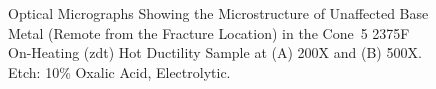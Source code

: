 \begin{figure}
\centering
{}


\caption{Optical Micrographs Showing the Microstructure of Unaffected Base Metal (Remote from the Fracture Location) in the Cone~5 2375\textdegree{}F On-Heating (\gls{zdt}) Hot Ductility Sample at (A) 200X and (B) 500X.  Etch: 10\% Oxalic Acid, Electrolytic.}
\label{fig:c5-oh-2375-remote}
\end{figure}

